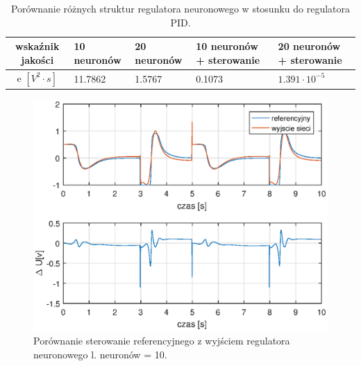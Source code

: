 	\begin{table}[h]
		\caption{Porównanie różnych struktur regulatora neuronowego w stosunku do regulatora PID.}
		\label{optNeural}
		\centering
		
		\begin{tabular}{|c|M{2.5cm}|M{2.5cm}|M{2.5cm}|M{2.5cm}|}
			\hline
			wska\'znik jakości&10 neuronów&20 neuronów&10 neuronów + sterowanie&20 neuronów + sterowanie\\
			\hline
			e $[V^2 \cdot s]$&11.7862 &   1.5767 &   0.1073& $1.391 \cdot 10^{-5}$ \\
			\hline
		\end{tabular}
	\end{table}
	
	
	\begin{figure}[h!]
		\centering
		\includegraphics[scale = 0.8]{fig/10neuron.eps}
		\caption		
		{Porównanie sterowanie referencyjnego z wyjściem regulatora neuronowego l. neuronów = 10.}
		\label{10n}
	\end{figure}

